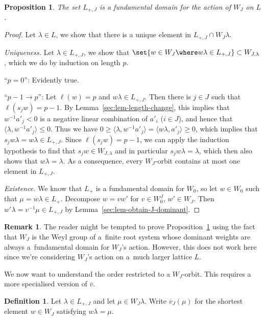 \documentclass[10pt,a4paper]{amsart}
\newtheorem{Proposition}[Theorem]{Proposition}
\theoremstyle{definition}
\newtheorem{Definition}[Theorem]{Definition}
\newtheorem{Remark}[Theorem]{Remark}
\numberwithin{equation}{section}
\begin{document}
\begin{Proposition}\label{sec:prop-J-fundamental-domain}
 The set $L_{+,J}$ is a fundamental domain for the action of $W_J$ on $L$.
\end{Proposition}
\begin{proof}
 Let $\lambda\in L$, we show that there is a unique element in $L_{+,J}\cap W_J\lambda$.

{\it Uniqueness.} Let $\lambda\in L_{+,J}$, we show that
$
 \set{w\in W_J\where w\lambda\in L_{+,J}}\subset W_{J,\lambda}$,
 which we do by induction on length $p$.

``$p=0$'': Evidently true.

``$p-1\to p$'': Let $\ell(w)=p$ and $w\lambda\in L_{+,J}$. Then there is $j\in J$ such
 that $\ell(s_jw)=p-1$. By Lemma~\ref{sec:lem-length-change}, this
 implies that $w^{-1}a'_j<0$ is a negative
 linear combination of $a'_i$ ($i\in J$), and hence that
 $\big\langle \lambda, w^{-1}a'_j\big\rangle \le 0$. Thus we have
$
 0 \ge \big\langle \lambda, w^{-1}a'_j\big\rangle = \langle w\lambda, a'_j\rangle \ge 0$,
 which implies that $s_j w\lambda = w\lambda\in L_{+,J}$. Since $\ell(s_jw)=p-1$, we can apply the
 induction hypothesis to find that $s_jw\in W_{J,\lambda}$ and in particular $s_jw\lambda=\lambda$, which
 then also shows that $w\lambda=\lambda$. As a consequence, every $W_J$-orbit contains at most one element
 in $L_{+,J}$.

{\it Existence.} We know that $L_+$ is a fundamental domain for $W_0$, so let
 $w\in W_0$ such that $\mu=w\lambda\in L_+$. Decompose $w=vw'$ for $v\in W_0^J$, $w'\in W_J$. Then
$
 w'\lambda = v^{-1}\mu\in L_{+,J}
$
 by Lemma~\ref{sec:lem-obtain-J-dominant}.
\end{proof}

\begin{Remark}
 The reader might be tempted to prove Proposition~\ref{sec:prop-J-fundamental-domain} using the fact that $W_J$ is the Weyl group of
 a~finite root system whose dominant weights are always a~fundamental
 domain for $W_J$'s action. However, this does not work here since
 we're considering $W_J$'s action on a~much larger lattice $L$.
\end{Remark}

We now want to understand the order restricted to a $W_J$-orbit.
This requires a more specialised version of $\overline{v}$.

\begin{Definition}
 Let $\lambda\in L_{+,J}$ and let $\mu\in W_J\lambda$. Write
 $\overline{v}_J(\mu)$ for the shortest element $w\in W_J$ satisfying $w\lambda=\mu$.
\end{Definition}
\end{document}

